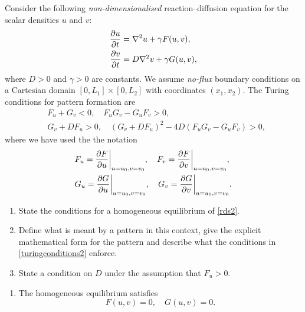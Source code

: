 \documentclass[a4paper, 12pt]{article}
\begin{document}
%

\begin{enumerate}[label={\bf \arabic{*}.\;}, ref={\arabic{*}},itemsep=3ex, left=0ex]

    {
      Consider the following \emph{non-dimensionalised} reaction--diffusion equation for the scalar densities $u$ and $v$:
      \begin{subequations}
        \label{rds2}
        \begin{align}
          \pd{u}{t} &= \nabla^2 u + \gamma F(u,v),\\
          \pd{v}{t} &= D \nabla^2 v + \gamma G(u,v),
        \end{align}
      \end{subequations}
      where $D>0$ and $\gamma>0$ are constants. We assume \emph{no-flux} boundary conditions on a Cartesian domain $[0,L_1]\times[0,L_2]$ with coordinates $(x_1,x_2)$. The Turing conditions for pattern formation are
      \begin{align}
        & F_u +G_v <0, \quad F_uG_v  -G_uF_v> 0,\nonumber \\
        & G_v + DF_u>0,\quad (G_v+ D F_u)^2 - 4 D (F_uG_v  -G_uF_v) >0,\label{turingconditions2}
      \end{align}
      where we have used the the notation
      \begin{align*}
        &F_{u} = \pd{F}{u}\bigg\vert_{u=u_0,v=v_0},\quad F_{v} = \pd{F}{v}\bigg\vert_{u=u_0,v=v_0},\\
        &G_{u} = \pd{G}{u}\bigg\vert_{u=u_0,v=v_0},\quad G_{v} = \pd{G}{v}\bigg\vert_{u=u_0,v=v_0}.
      \end{align*}
      \begin{enumerate}[label=(\alph*)]
        \item{State the conditions for a homogeneous equilibrium of \cref{rds2}.
          }
        \item{  Define what is meant by a pattern in this context, give the explicit mathematical form for the pattern and describe what the conditions in \cref{turingconditions2} enforce.
          }
        \item{State a condition on $D$ under the assumption that $F_u>0.$
          }
      \end{enumerate}
    }
    {
      \begin{enumerate}[label=(\alph*)]
        \item The homogeneous equilibrium satisfies
          \begin{equation}
            F(u,v) =0,\quad G(u,v) = 0.
          \end{equation}


\end{enumerate}}
\end{enumerate}
\end{document}
